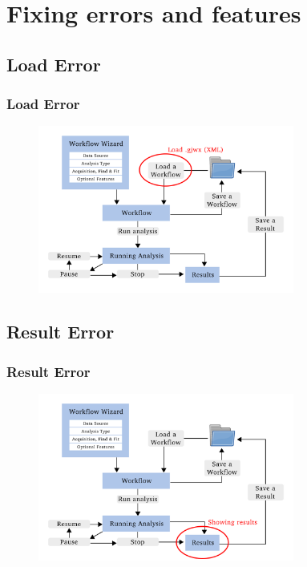 \documentclass[aspectratio=169]{beamer}
\begin{document}
\begin{frame}
\begin{columns}
    
\end{columns}

    
\end{frame}
    

\section{Fixing errors and features}

\subsection{Load Error}
\begin{frame}
\frametitle{Load Error}
\begin{figure}[h!]
    \centering	\includegraphics[width=0.75\textwidth]{./images/load_error.pdf} 
    \end{figure} 
 
\end{frame}


\subsection{Result Error}
\begin{frame}
\frametitle{Result Error}
\begin{figure}[h!]
    \centering	\includegraphics[width=0.75\textwidth]{./images/results_error.pdf} 
    \end{figure} 
 
\end{frame}
\end{document}
